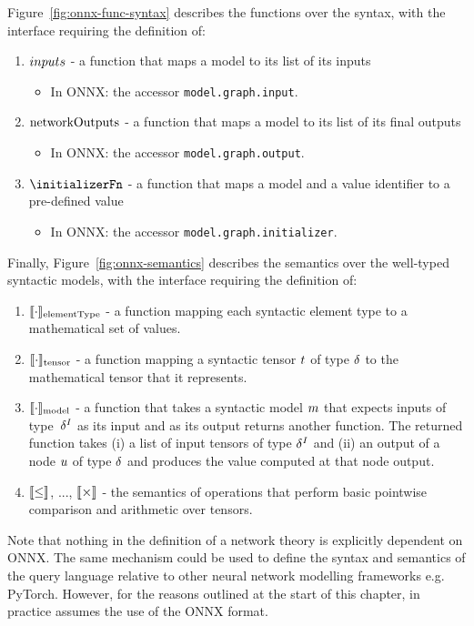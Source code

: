 Figure~\ref{fig:onnx-func-syntax} describes the functions over the syntax, with the interface requiring the definition of:
\begin{enumerate}
\item $inputs$ - a function that maps a model to its list of its inputs
\begin{itemize}
	\item In ONNX: the accessor \texttt{model.graph.input}.
\end{itemize}
\item $\text{networkOutputs}$ - a function that maps a model to its list of its final outputs
\begin{itemize}
	\item In ONNX: the accessor \texttt{model.graph.output}.
\end{itemize}
\item $\initializerFn$ - a function that maps a model and a value identifier to a pre-defined value
\begin{itemize}
	\item In ONNX: the accessor \texttt{model.graph.initializer}.
\end{itemize}
\end{enumerate}
Finally, Figure~\ref{fig:onnx-semantics} describes the semantics over the well-typed syntactic models, with the interface requiring the definition of:
\begin{enumerate}
\item $\llbracket \cdot \rrbracket_\text{elementType}$ - a function mapping each syntactic element type to a mathematical set of values.
\item $\llbracket \cdot \rrbracket_\text{tensor}$ - a function mapping a syntactic tensor $t$ of type $\delta$ to the mathematical tensor that it represents.
\item $\llbracket \cdot \rrbracket_\text{model}$ - a function that takes a syntactic model $m$ that expects inputs of type~$\delta^I$ as its input and as its output returns another function. The returned function takes (i) a list of input tensors of type $\delta^I$ and (ii) an output of a node $u$ of type $\delta$ and produces the value computed at that node output.
\item $\llbracket \leq \rrbracket$, ..., $\llbracket \times \rrbracket$ - the semantics of operations that perform basic pointwise comparison and arithmetic over tensors.
\end{enumerate}
Note that nothing in the definition of a network theory is explicitly dependent on ONNX. 
The same mechanism could be used to define the syntax and semantics of the \vnnlib{} query language relative to other neural network modelling frameworks e.g. PyTorch. 
However, for the reasons outlined at the start of this chapter, in practice \vnnlib{} assumes the use of the ONNX format.